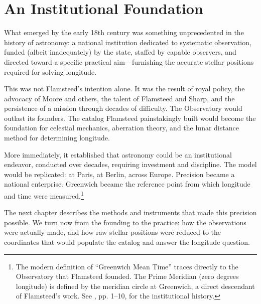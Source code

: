 \section{An Institutional Foundation}
\label{sec:institutional-foundation}

What emerged by the early 18th century was something unprecedented in the history of astronomy: a national institution dedicated to systematic observation, funded (albeit inadequately) by the state, staffed by capable observers, and directed toward a specific practical aim---furnishing the accurate stellar positions required for solving longitude.

This was not Flamsteed's intention alone. It was the result of royal policy, the advocacy of Moore and others, the talent of Flamsteed and Sharp, and the persistence of a mission through decades of difficulty. The Observatory would outlast its founders. The catalog Flamsteed painstakingly built would become the foundation for celestial mechanics, aberration theory, and the lunar distance method for determining longitude.

More immediately, it established that astronomy could be an institutional endeavor, conducted over decades, requiring investment and discipline. The model would be replicated: at Paris, at Berlin, across Europe. Precision became a national enterprise. Greenwich became the reference point from which longitude and time were measured.\footnote{The modern definition of ``Greenwich Mean Time'' traces directly to the Observatory that Flamsteed founded. The Prime Meridian (zero degrees longitude) is defined by the meridian circle at Greenwich, a direct descendant of Flamsteed's work. See \textcite{Howse1980}, pp. 1--10, for the institutional history.}

The next chapter describes the methods and instruments that made this precision possible. We turn now from the founding to the practice: how the observations were actually made, and how raw stellar positions were reduced to the coordinates that would populate the catalog and answer the longitude question.

